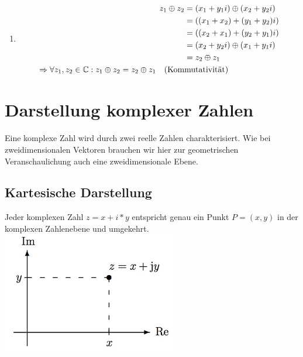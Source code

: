 \begin{Beweis}
\begin{enumerate}[1)]
			\item \begin{align*}
						z_1 \oplus z_2 &= (x_1 + y_1i) \oplus (x_2 + y_2i) \\
									   &= ((x_1 + x_2) + (y_1 + y_2)i) \\
									   &= ((x_2 + x_1) + (y_2 + y_1)i) \\
									   &= (x_2 + y_2i) \oplus (x_1 + y_1i) \\
									   &= z_2 \oplus z_1 \\
						\Rightarrow \forall z_1, z_2 \in \mathbb{C}: z_1 \oplus z_2 = z_2 \oplus z_1 \quad \text{(Kom}&\text{mutativität)}
				  \end{align*}
		\end{enumerate}
	\end{Beweis}

\section{Darstellung komplexer Zahlen}

	Eine komplexe Zahl wird durch zwei reelle Zahlen charakterisiert. Wie bei zweidimensionalen Vektoren brauchen wir hier zur geometrischen Veranschaulichung auch eine zweidimensionale Ebene.\\

	\subsection{Kartesische Darstellung}

		Jeder komplexen Zahl $z =x+i*y$ entspricht genau ein Punkt $P =(x,y)$ in der komplexen Zahlenebene und umgekehrt.\\

		\includegraphics[width=3in]{kap6/komplexezahlen1}

